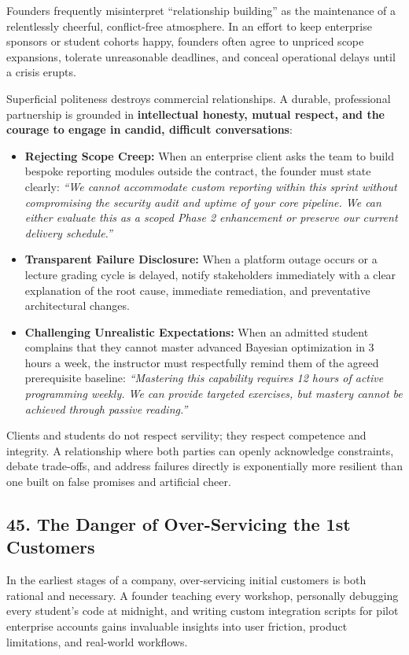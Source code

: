 Founders frequently misinterpret ``relationship building'' as the maintenance of a relentlessly cheerful, conflict-free atmosphere. In an effort to keep enterprise sponsors or student cohorts happy, founders often agree to unpriced scope expansions, tolerate unreasonable deadlines, and conceal operational delays until a crisis erupts.

Superficial politeness destroys commercial relationships. A durable, professional partnership is grounded in \textbf{intellectual honesty, mutual respect, and the courage to engage in candid, difficult conversations}:
\begin{itemize}[leftmargin=*]
\item \textbf{Rejecting Scope Creep:} When an enterprise client asks the team to build bespoke reporting modules outside the contract, the founder must state clearly: \textit{``We cannot accommodate custom reporting within this sprint without compromising the security audit and uptime of your core pipeline. We can either evaluate this as a scoped Phase 2 enhancement or preserve our current delivery schedule.''}
\item \textbf{Transparent Failure Disclosure:} When a platform outage occurs or a lecture grading cycle is delayed, notify stakeholders immediately with a clear explanation of the root cause, immediate remediation, and preventative architectural changes.
\item \textbf{Challenging Unrealistic Expectations:} When an admitted student complains that they cannot master advanced Bayesian optimization in 3 hours a week, the instructor must respectfully remind them of the agreed prerequisite baseline: \textit{``Mastering this capability requires 12 hours of active programming weekly. We can provide targeted exercises, but mastery cannot be achieved through passive reading.''}
\end{itemize}

Clients and students do not respect servility; they respect competence and integrity. A relationship where both parties can openly acknowledge constraints, debate trade-offs, and address failures directly is exponentially more resilient than one built on false promises and artificial cheer.

\subsection*{45. The Danger of Over-Servicing the 1st Customers}

In the earliest stages of a company, over-servicing initial customers is both rational and necessary. A founder teaching every workshop, personally debugging every student's code at midnight, and writing custom integration scripts for pilot enterprise accounts gains invaluable insights into user friction, product limitations, and real-world workflows.

